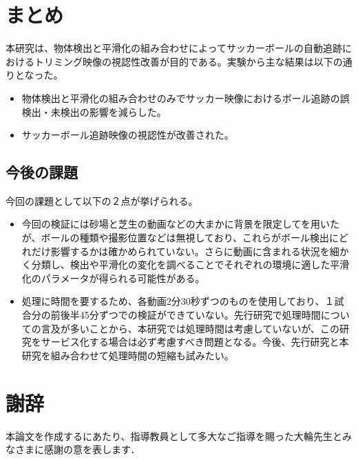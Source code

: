 \documentclass[11pt,a4j]{jreport}
\begin{document}
\chapter{まとめ}

本研究は、物体検出と平滑化の組み合わせによってサッカーボールの自動追跡におけるトリミング映像の視認性改善が目的である。実験から主な結果は以下の通りとなった。

\begin{itemize}
    \item 物体検出と平滑化の組み合わせのみでサッカー映像におけるボール追跡の誤検出・未検出の影響を減らした。
    \item サッカーボール追跡映像の視認性が改善された。
\end{itemize}

\section{今後の課題}

今回の課題として以下の２点が挙げられる。

\begin{itemize}
    \item 今回の検証には砂場と芝生の動画などの大まかに背景を限定してを用いたが、ボールの種類や撮影位置などは無視しており、これらがボール検出にどれだけ影響するかは確かめられていない。さらに動画に含まれる状況を細かく分類し、検出や平滑化の変化を調べることでそれぞれの環境に適した平滑化のパラメータが得られる可能性がある。
    \item 処理に時間を要するため、各動画2分30秒ずつのものを使用しており、１試合分の前後半45分ずつでの検証ができていない。先行研究で処理時間についての言及が多いことから、本研究では処理時間は考慮していないが、この研究をサービス化する場合は必ず考慮すべき問題となる。今後、先行研究と本研究を組み合わせて処理時間の短縮も試みたい。
\end{itemize}

\chapter*{謝辞} %
本論文を作成するにあたり、指導教員として多大なご指導を賜った大輪先生とみなさまに感謝の意を表します．

\end{document}
